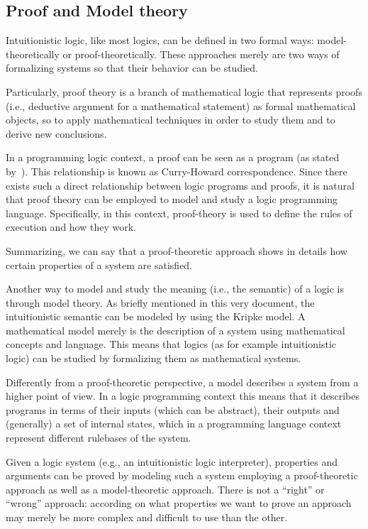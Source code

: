 \begin{appendices}
  \section{Proof and Model theory}
  Intuitionistic logic, like most logics, can be defined in two formal ways:
  model-theoretically or proof-theoretically.
  These approaches merely are two ways of formalizing systems so that
  their behavior can be studied.

  Particularly, proof theory is a branch of mathematical logic that represents proofs (i.e.,
  deductive argument for a mathematical statement) as formal
  mathematical objects, so to apply mathematical techniques in
  order to study them and to derive new conclusions.

  In a programming logic context, a proof can be seen as a program (as stated by~\cite{PropAsTypes}).
  This relationship is known as Curry-Howard correspondence. Since there exists
  such a direct relationship between logic programs and proofs, it is
  natural that proof theory can be employed to model and study a logic programming
  language. Specifically, in this context,
  proof-theory is used to define the rules of execution and how they work.

  Summarizing, we can say that a proof-theoretic approach shows in details how certain
  properties of a system are satisfied.

  Another way to model and study the meaning (i.e., the semantic) of a logic is through model
  theory. As briefly mentioned in this very document, the intuitionistic semantic can be
  modeled by using the Kripke model. A mathematical model merely is the description of
  a system using mathematical concepts and language. This means that logics
  (as for example intuitionistic logic) can be studied by formalizing them as
  mathematical systems.

  Differently from a proof-theoretic perspective, a model describes a system from a
  higher point of view. In a logic programming context this means that it describes
  programs in terms of their inputs (which can be abstract), their outputs
  and (generally) a set of internal states, which in a programming language context
  represent different rulebases of the system.

  Given a logic system (e.g., an intuitionistic logic interpreter), properties and
  arguments can be proved by modeling such a system employing a proof-theoretic approach
  as well as a model-theoretic approach.
  There is not a ``right'' or ``wrong'' approach: according on what properties we want to prove
  an approach may merely be more complex and difficult to use than the other.


\end{appendices}
